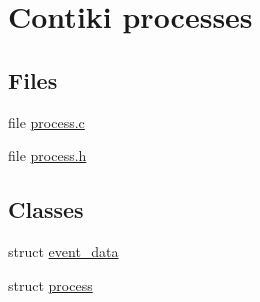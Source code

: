 \hypertarget{group__process}{\section{Contiki processes}
\label{group__process}
}
\subsection*{Files}
\begin{DoxyCompactItemize}
\item 
file \hyperlink{process_8c}{process.\-c}
\item 
file \hyperlink{process_8h}{process.\-h}
\end{DoxyCompactItemize}
\subsection*{Classes}
\begin{DoxyCompactItemize}
\item 
struct \hyperlink{structevent__data}{event\-\_\-data}
\item 
struct \hyperlink{structprocess}{process}
\end{DoxyCompactItemize}
